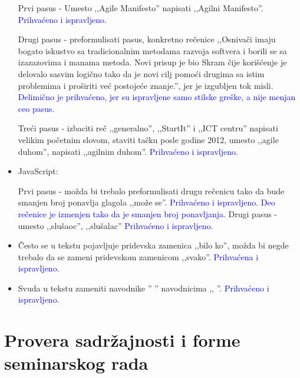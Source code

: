 \documentclass[a4paper]{report}
\newcommand{\odgovor}[1]{\textcolor{blue}{#1}}
\begin{document}
\begin{itemize}
    Prvi pasus - Umesto ,,Agile Manifesto'' napisati ,,Agilni Manifesto''.
    \odgovor{Prihvaćeno i ispravljeno.}
    
    Drugi pasus -  preformulisati pasus, konkretno rečenice ,,Osnivači imaju bogato iskustvo sa tradicionalnim metodama razvoja softvera i borili se sa izazazovima i manama metoda. Novi prisup je bio Skram čije korišćenje je delovalo sasvim logično tako da je novi cilj pomoći drugima sa istim problemima i proširiti već postojeće znanje.'', jer je izgubljen tok misli.
    \odgovor{Delimično je prihvaćeno, jer su ispravljene samo stilske greške, a nije menjan ceo pasus.}
    
    Treći pasus - izbaciti reč ,,generalno'', ,,StartIt'' i ,,ICT centru'' napisati velikim početnim slovom, staviti tačku posle godine 2012, umesto ,,agile duhom'', napisati ,,agilnim duhom''. 
    \odgovor{Prihvaćeno i ispravljeno.}
    \item JavaScript:
    
    Prvi pasus - možda bi trebalo preformulisati drugu rečenicu tako da bude smanjen broj ponavlja glagola ,,može se''.
    \odgovor{Prihvaćeno i ispravljeno. Deo rečenice je izmenjen tako da je smanjen broj ponavljanja.}
    Drugi pasus - umesto ,,slušaoc'', ,,slušalac''
    \odgovor{Prihvaćeno i ispravljeno.}
    \item Često se u tekstu pojavljuje pridevska zamenica ,,bilo ko'',  možda bi negde trebalo da se zameni pridevskom zamenicom ,,svako''.
    \odgovor{Prihvaćena i ispravljeno.}
    \item Svuda u tekstu zameniti navodnike '' '' navodnicima ,, ''.
    \odgovor{Prihvaćeno i ispravljeno.} %
    
   
    
\end{itemize}
\section{Provera sadržajnosti i forme seminarskog rada}
\end{document}
